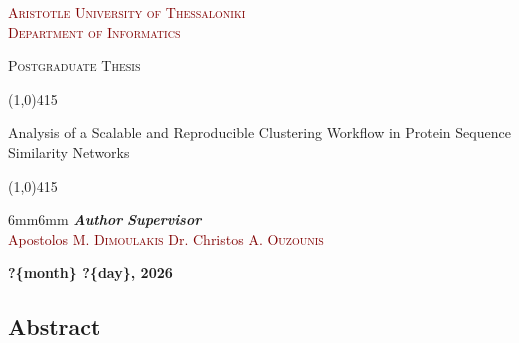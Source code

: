 \documentclass[a4paper,12pt]{extarticle}
\begin{document}
  \pagestyle{plain}  %


  \begin{titlepage}
    \begin{center}
      \vspace*{1cm}  %

      \Large{\textsc{\textcolor{maroon}{Aristotle University of
Thessaloniki\\Department of Informatics}}}

      \vspace{1.5cm}

      \Large{\textsc{Postgraduate Thesis}}

      \vspace{1cm}

      \line(1,0){415}
      \vspace{5.5mm}
      {\fontsize{20}{24}\selectfont\bfseries
        \parbox{415pt}{\centering Analysis of a Scalable and Reproducible Clustering Workflow in Protein Sequence Similarity Networks}
      }

      \vspace{2mm}
      \line(1,0){415}
    \end{center}
    \vspace{3cm}
    \begin{adjustwidth}{6mm}{6mm}
      \large{\textbf{\textit{Author}}}
      \hfill
      \large{\textbf{\textit{Supervisor}}}
      \\
      \textcolor{maroon}{\large{Apostolos M. \textsc{Dimoulakis}}}
      \hfill
      \textcolor{maroon}{\large{Dr. Christos A. \textsc{Ouzounis}}}
      \\
    \end{adjustwidth}
    
    \vspace{\fill}
    
    \begin{center}
      \textbf{\large{?\{month\} ?\{day\}, 2026}}
    \end{center}
  \end{titlepage}
  

  
  \thispagestyle{firstpages}
  
  \subsection*{%
    \center Abstract
  }
  
\end{document}

